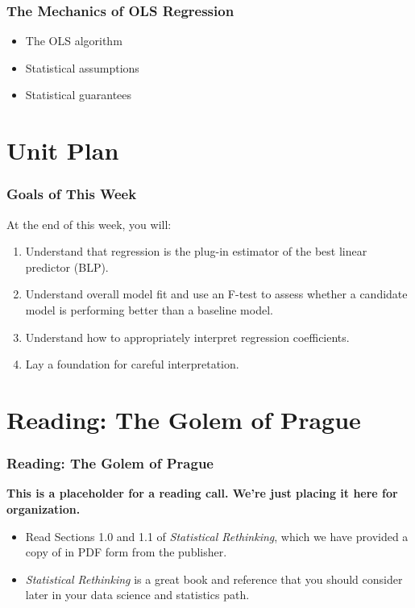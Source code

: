 \documentclass[12pt, block=fill]{beamer}
\begin{document}
\begin{frame}
  \frametitle{The Mechanics of OLS Regression}
  
  \begin{itemize}
\item The OLS algorithm
\item Statistical assumptions
\item Statistical guarantees
\end{itemize}
\end{frame}

\section{Unit Plan}

\begin{frame}
  \frametitle{Goals of This Week}
  At the end of this week, you will: 
  \begin{enumerate}
  \item Understand that regression is the plug-in estimator
    of the best linear predictor (BLP). 
  \item Understand overall model fit and use an F-test to assess
    whether a candidate model is performing better than a baseline
    model.
  \item Understand how to appropriately interpret regression
    coefficients.
  \item Lay a foundation for careful interpretation. 
  \end{enumerate}

\end{frame}

\section{Reading: The Golem of Prague}

\begin{frame}
  \frametitle{Reading: The Golem of Prague}
  \textbf{This is a placeholder for a reading call. We're just placing
    it here for organization.} 
  \begin{itemize}
  \item Read Sections 1.0 and 1.1 of \textit{Statistical Rethinking},
    which we have provided a copy of in PDF form from the publisher.
  \item \textit{Statistical Rethinking} is a great book and reference
    that you should consider later in your data science and statistics
    path.
  \end{itemize}
\end{frame}
\end{document}
